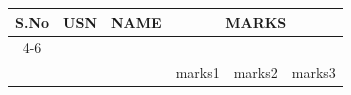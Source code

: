 \documentclass[12pt,a4paper]{article}
\begin{document}
\centering
\begin{tabular}{|c|c|c|c|c|c|}
\hline
\multirow{2}{*}{S.No} & \multirow{2}{*}{USN} & \multirow{2}{*}{NAME} & \multicolumn{3}{c|}{MARKS} \\
\cline{4-6}\\
& & & marks1 & marks2 & marks3\\
\hline
\end{tabular}
\end{document}

